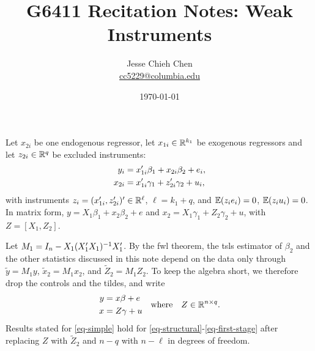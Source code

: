 \documentclass[a4paper,12pt]{article}
\title{G6411 Recitation Notes: Weak Instruments}
\author{Jesse Chieh Chen\\\href{mailto:cc5229@columbia.edu}{cc5229@columbia.edu}}
\date{\today}
\begin{document}
\maketitle


\begin{definition}\label{def-iv-model}
	Let $x_{2i}$ be one endogenous regressor,
	let $x_{1i}\in\mathbb{R}^{k_1}$ be exogenous regressors
	and let $z_{2i}\in\mathbb{R}^q$ be excluded instruments:
	\begin{align}
		y_i&=x_{1i}^{\prime}\beta_1+x_{2i}\beta_2+e_i,\label{eq-structural}\\
		x_{2i}&=x_{1i}^{\prime}\gamma_1+z_{2i}^{\prime}\gamma_2+u_i,\label{eq-first-stage}
	\end{align}
	with instruments $z_i=(x_{1i}^{\prime},z_{2i}^{\prime})^{\prime}\in\mathbb{R}^\ell$, $\ell=k_1+q$, and
	$\operatorname{\mathbb{E}}(z_ie_i)=0$, $\operatorname{\mathbb{E}}(z_iu_i)=0$.
	In matrix form, $y=X_1\beta_1+x_2\beta_2+e$ and $x_2=X_1\gamma_1+Z_2\gamma_2+u$, with $Z=[X_1,Z_2]$.
\end{definition}

\begin{remark}
	Let $M_1=I_n-X_1(X_1^{\prime} X_1)^{-1} X_1^{\prime}$.
	By the \gls{fwl} theorem,
	the \gls{tsls} estimator of $\beta_2$ and the other statistics discussed in this note depend on the data only through
	$\tilde y=M_1y$, $\tilde x_2=M_1x_2$, and $\tilde Z_2=M_1Z_2$.
	To keep the algebra short, we therefore drop the controls and the tildes, and write
	\begin{align}\label{eq-simple}
		\begin{aligned}
			y&=x\beta+e \\
			x&=Z\gamma+u
		\end{aligned}
		\quad\text{where}\quad
		Z\in\mathbb{R}^{n\times q}.
	\end{align}
	Results stated for \eqref{eq-simple} hold for \eqref{eq-structural}-\eqref{eq-first-stage}
	after replacing $Z$ with $\tilde Z_2$ and $n-q$ with $n-\ell$ in degrees of freedom.
\end{remark}
\end{document}

